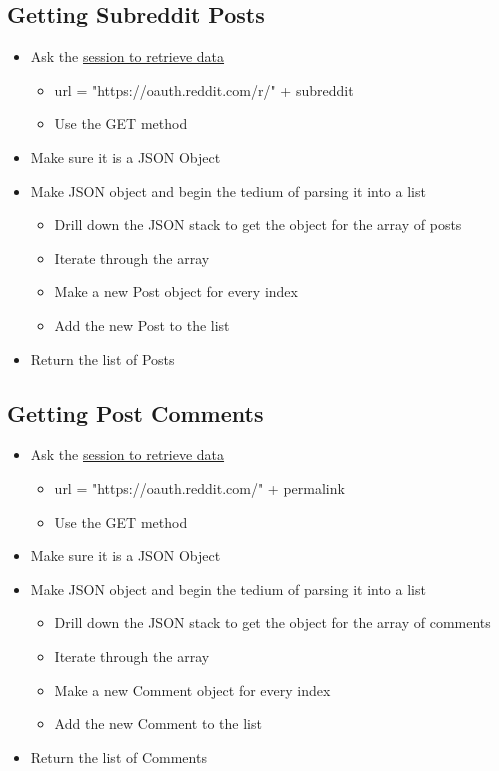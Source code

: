 \documentclass[12pt]{article}
\begin{document}
\subsection{Getting Subreddit Posts}
\begin{itemize}
	\item Ask the \hyperlink{Read Data (session)}{session to retrieve data}
	\begin{itemize}
		\item url = "https://oauth.reddit.com/r/" + subreddit
		\item Use the GET method
	\end{itemize}
	\item Make sure it is a JSON Object
	\item Make JSON object and begin the tedium of parsing it into a list
	\begin{itemize}
		\item Drill down the JSON stack to get the object for the array of posts
		\item Iterate through the array
		\item Make a new Post object for every index
		\item Add the new Post to the list
	\end{itemize}
	\item Return the list of Posts
\end{itemize}

\subsection{Getting Post Comments}
\begin{itemize}
	\item Ask the \hyperlink{Read Data (session)}{session to retrieve data}
	\begin{itemize}
		\item url = "https://oauth.reddit.com/" + permalink
		\item Use the GET method
	\end{itemize}
	\item Make sure it is a JSON Object
	\item Make JSON object and begin the tedium of parsing it into a list
	\begin{itemize}
		\item Drill down the JSON stack to get the object for the array of comments
		\item Iterate through the array
		\item Make a new Comment object for every index
		\item Add the new Comment to the list
	\end{itemize}
	\item Return the list of Comments
\end{itemize}
\end{document}
